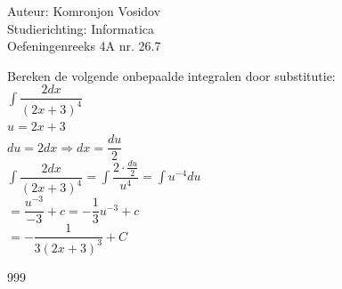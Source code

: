 \documentclass[a4paper]{article}
\newcommand{\dint}{\displaystyle\int}
\begin{document}
	
	\noindent \large Auteur: Komronjon Vosidov \\
	\noindent \large Studierichting: Informatica\\
	\noindent \large Oefeningenreeks 4A nr. 26.7\\
	
	\medskip
	
	\normalsize
    Bereken de volgende onbepaalde integralen door substitutie:\\
	
	$\dint \dfrac{2dx}{(2x + 3)^4} $\\
	
	$ u = 2x + 3 $\\
	
	$du = 2dx \Rightarrow dx = \dfrac{du}{2}$\\
	
	$\dint \dfrac{2dx}{(2x + 3)^4} = \dint \dfrac{2 \cdot \tfrac{du}{2}}{u^4} = \dint u^{-4} du$\\
		
	$= \dfrac{u^{-3}}{-3} +c= -\dfrac{1}{3} u^{-3}+c$\\
	
	$= -\dfrac{1}{3(2x + 3)^3} + C$\\
		
	
	
	
	\begin{thebibliography}{999}
	\end{thebibliography}		
\end{document}
